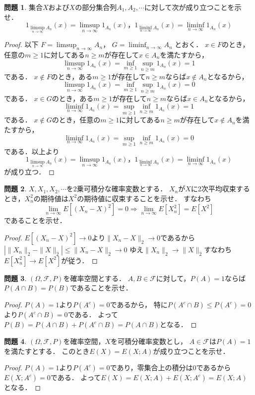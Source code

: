 \documentclass{jsarticle}
\theoremstyle{definition}
\newtheorem{qst}{問題}
\begin{document}
\begin{qst}
集合$X$および$X$の部分集合列$A_1,A_2,\cdots$に対して次が成り立つことを示せ．
\[ 1_{\limsup_{n\to\infty}A_n}(x)=\limsup_{n\to\infty}1_{A_n}(x)，
1_{\liminf_{n\to\infty}A_n}(x)=\liminf_{n\to\infty}1_{A_n}(x) \]
\end{qst}
\begin{proof}
以下
$F=\displaystyle\limsup_{n\to\infty}A_n$，
$G=\displaystyle\liminf_{n\to\infty}A_n$
とおく．
$x\in F$のとき，任意の$m\geq1$に対してある$n\geq m$が存在して$x\in A_n$を満たすから，
\[ \limsup_{n\to\infty}1_{A_n}(x)=\inf_{m\geq1}\sup_{n\geq m}1_{A_n}(x)=1 \]
である．
$x\notin F$のとき，ある$m\geq1$が存在して$n\geq m$ならば$x\notin A_n$となるから，
\[ \limsup_{n\to\infty}1_{A_n}(x)=\inf_{m\geq1}\sup_{n\geq m}1_{A_n}(x)=0 \]
である．
$x\in G$のとき，ある$m\geq1$が存在して$n\geq m$ならば$x\in A_n$となるから，
\[ \liminf_{n\to\infty}1_{A_n}(x)=\sup_{m\geq1}\inf_{n\geq m}1_{A_n}(x)=1 \]
である．
$x\notin G$のとき，任意の$m\geq1$に対してある$n\geq m$が存在して$x\notin A_n$を満たすから，
\[ \liminf_{n\to\infty}1_{A_n}(x)=\sup_{m\geq1}\inf_{n\geq m}1_{A_n}(x)=0 \]
である．以上より
\[ 1_{\limsup_{n\to\infty}A_n}(x)=\limsup_{n\to\infty}1_{A_n}(x)，
1_{\liminf_{n\to\infty}A_n}(x)=\liminf_{n\to\infty}1_{A_n}(x) \]
が成り立つ．
\end{proof}

\begin{qst}
$X,X_1,X_2,\cdots$を2乗可積分な確率変数とする．
$X_n$が$X$に2次平均収束するとき，$X_n^2$の期待値は$X^2$の期待値に収束することを示せ．
すなわち
\[ \lim_{n\to\infty}E[(X_n-X)^2]=0\Rightarrow\lim_{n\to\infty}E[X_n^2]=E[X^2] \]
であることを示せ．
\end{qst}
\begin{proof}
$E[(X_n-X)^2]\to0$より$\|X_n-X\|_2\to0$であるから
$|\|X_n\|_2-\|X\|_2|\leq\|X_n-X\|_2\to0$
ゆえ$\|X_n\|_2\to\|X\|_2$すなわち$E[X_n^2]\to E[X^2]$が従う．
\end{proof}

\begin{qst}
$(\Omega,\mathcal{F},P)$を確率空間とする．
$A,B\in\mathcal{F}$に対して，$P(A)=1$ならば$P(A\cap B)=P(B)$であることを示せ．
\end{qst}
\begin{proof}
$P(A)=1$より$P(A^c)=0$であるから，
特に$P(A^c\cap B)\leq P(A^c)=0$より$P(A^c\cap B)=0$である．
よって$P(B)=P(A\cap B)+P(A^c\cap B)=P(A\cap B)$となる．
\end{proof}

\begin{qst}
$(\Omega,\mathcal{F},P)$を確率空間，$X$を可積分確率変数とし，
$A\in\mathcal{F}$は$P(A)=1$を満たすとする．
このとき$E(X)=E(X;A)$が成り立つことを示せ．
\end{qst}
\begin{proof}
$P(A)=1$より$P(A^c)=0$であり，零集合上の積分は0であるから$E(X;A^c)=0$である．
よって$E(X)=E(X;A)+E(X;A^c)=E(X;A)$となる．
\end{proof}
\end{document}
